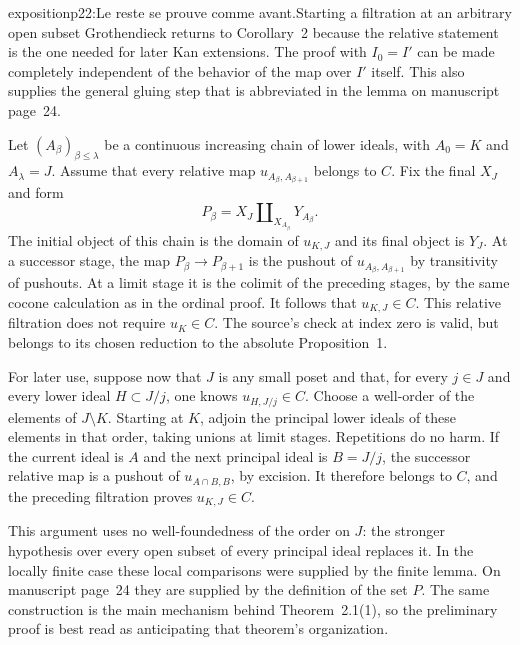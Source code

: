 \begin{dcomment}{exposition}{p22:Le reste se prouve comme avant.}{Starting a filtration at an arbitrary open subset}
Grothendieck returns to Corollary~2 because the relative statement is the one needed for later Kan extensions. The proof with $I_0=I'$ can be made completely independent of the behavior of the map over $I'$ itself. This also supplies the general gluing step that is abbreviated in the lemma on manuscript page~24.

Let $(A_\beta)_{\beta\leq\lambda}$ be a continuous increasing chain of lower ideals, with $A_0=K$ and $A_\lambda=J$. Assume that every relative map $u_{A_\beta,A_{\beta+1}}$ belongs to $C$. Fix the final $X_J$ and form
\[
 P_\beta=X_J\amalg_{X_{A_\beta}}Y_{A_\beta}.
\]
The initial object of this chain is the domain of $u_{K,J}$ and its final object is $Y_J$. At a successor stage, the map $P_\beta\to P_{\beta+1}$ is the pushout of $u_{A_\beta,A_{\beta+1}}$ by transitivity of pushouts. At a limit stage it is the colimit of the preceding stages, by the same cocone calculation as in the ordinal proof. It follows that $u_{K,J}\in C$. This relative filtration does not require $u_K\in C$. The source's check at index zero is valid, but belongs to its chosen reduction to the absolute Proposition~1.

For later use, suppose now that $J$ is any small poset and that, for every $j\in J$ and every lower ideal $H\subset J/j$, one knows $u_{H,J/j}\in C$. Choose a well-order of the elements of $J\setminus K$. Starting at $K$, adjoin the principal lower ideals of these elements in that order, taking unions at limit stages. Repetitions do no harm. If the current ideal is $A$ and the next principal ideal is $B=J/j$, the successor relative map is a pushout of $u_{A\cap B,B}$, by excision. It therefore belongs to $C$, and the preceding filtration proves $u_{K,J}\in C$.

This argument uses no well-foundedness of the order on $J$: the stronger hypothesis over every open subset of every principal ideal replaces it. In the locally finite case these local comparisons were supplied by the finite lemma. On manuscript page~24 they are supplied by the definition of the set $P$. The same construction is the main mechanism behind Theorem~2.1(1), so the preliminary proof is best read as anticipating that theorem's organization.
\end{dcomment}

